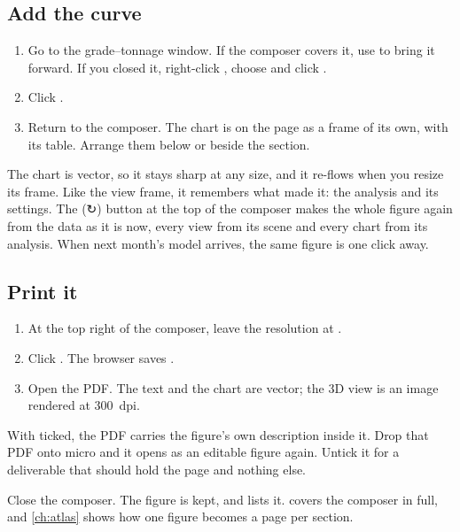 \subsection{Add the curve}
\begin{tryit}
\begin{enumerate}
\item Go to the grade–tonnage window. If the composer covers it, use  to bring it forward. If you closed it, right-click , choose  and click .
\item Click .
\item Return to the composer. The chart is on the page as a frame of its own, with its table. Arrange them below or beside the section.
\end{enumerate}
\end{tryit}

The chart is vector, so it stays sharp at any size, and it re-flows when you resize its frame. Like the view frame, it remembers what made it: the analysis and its settings. The  (↻) button at the top of the composer makes the whole figure again from the data as it is now, every view from its scene and every chart from its analysis. When next month's model arrives, the same figure is one click away.

\subsection{Print it}
\begin{tryit}
\begin{enumerate}
\item At the top right of the composer, leave the resolution at .
\item Click . The browser saves .
\item Open the PDF. The text and the chart are vector; the 3D view is an image rendered at 300~dpi.
\end{enumerate}
\end{tryit}

\begin{note}
With  ticked, the PDF carries the figure's own description inside it. Drop that PDF onto micro and it opens as an editable figure again. Untick it for a deliverable that should hold the page and nothing else.
\end{note}

Close the composer. The figure is kept, and  lists it.  covers the composer in full, and \cref{ch:atlas} shows how one figure becomes a page per section.

